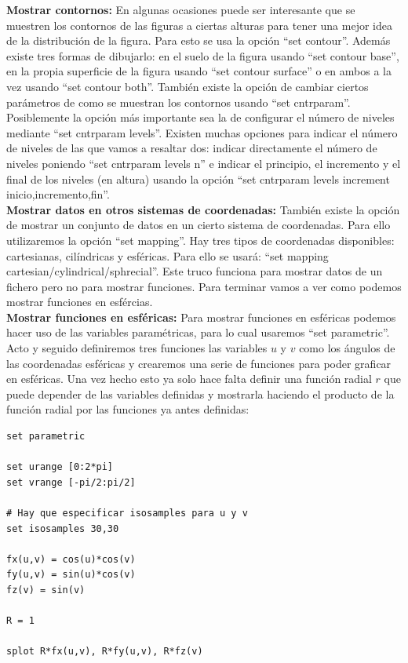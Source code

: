 \documentclass[11pt,a4paper,twoside,pdf]{article}
\numberwithin{equation}{section}
\begin{document}
\textbf{Mostrar contornos:} En algunas ocasiones puede ser interesante que se muestren los contornos de las figuras a ciertas alturas para tener una mejor idea de la distribución de la figura. Para esto se usa la opción ``set contour''. Además existe tres formas de dibujarlo: en el suelo de la figura usando ``set contour base'', en la propia superficie de la figura usando ``set contour surface'' o en ambos a la vez usando ``set contour both''. También existe la opción de cambiar ciertos parámetros de como se muestran los contornos usando ``set cntrparam''. Posiblemente la opción más importante sea la de configurar el número de niveles mediante ``set cntrparam levels''. Existen muchas opciones para indicar el número de niveles de las que vamos a resaltar dos: indicar directamente el número de niveles poniendo ``set cntrparam levels n'' e indicar el principio, el incremento y el final de los niveles (en altura) usando la opción ``set cntrparam levels increment inicio,incremento,fin''. \\

\textbf{Mostrar datos en otros sistemas de coordenadas:} También existe la opción de mostrar un conjunto de datos en un cierto sistema de coordenadas. Para ello utilizaremos la opción ``set mapping''. Hay tres tipos de coordenadas disponibles: cartesianas, cilíndricas y esféricas. Para ello se usará: ``set mapping cartesian/cylindrical/sphrecial''. Este truco funciona para mostrar datos de un fichero pero no para mostrar funciones. Para terminar vamos a ver como podemos mostrar funciones en esfércias. \\

\textbf{Mostrar funciones en esféricas:} Para mostrar funciones en esféricas podemos hacer uso de las variables paramétricas, para lo cual usaremos ``set parametric''. Acto y seguido definiremos tres funciones las variables $u$ y $v$ como los ángulos de las coordenadas esféricas y crearemos una serie de funciones para poder graficar en esféricas. Una vez hecho esto ya solo hace falta definir una función radial $r$ que puede depender de las variables definidas y mostrarla haciendo el producto de la función radial por las funciones ya antes definidas:

\begin{lstlisting}[language=Gnuplot]
set parametric

set urange [0:2*pi]
set vrange [-pi/2:pi/2]

# Hay que especificar isosamples para u y v
set isosamples 30,30

fx(u,v) = cos(u)*cos(v)
fy(u,v) = sin(u)*cos(v)
fz(v) = sin(v)

R = 1

splot R*fx(u,v), R*fy(u,v), R*fz(v)
\end{lstlisting}
\end{document}
